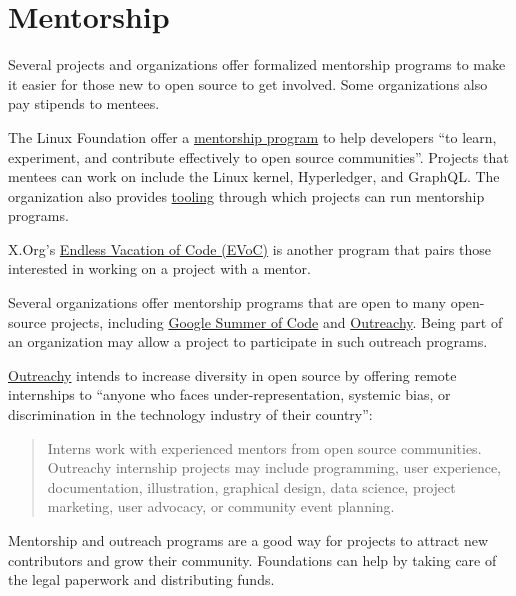 


\chapter{Mentorship}

Several projects and organizations offer formalized mentorship programs to make it easier for those new to open source to get involved.  Some organizations also pay stipends to mentees.

The Linux Foundation offer a \href{https://www.linuxfoundation.org/en/about/diversity-inclusivity/mentorship/}{mentorship program} to help developers ``to learn, experiment, and contribute effectively to open source communities''.  Projects that mentees can work on include the Linux kernel, Hyperledger, and GraphQL.  The organization also provides \href{https://lfx.linuxfoundation.org/tools/mentorship}{tooling} through which projects can run mentorship programs.

X.Org's \href{https://www.x.org/wiki/XorgEVoC/}{Endless Vacation of Code (EVoC)} is another program that pairs those interested in working on a project with a mentor.

Several organizations offer mentorship programs that are open to many open-source projects, including \href{https://summerofcode.withgoogle.com/}{Google Summer of Code} and \href{https://www.outreachy.org/}{Outreachy}.  Being part of an organization may allow a project to participate in such outreach programs.

\begin{kaobox}[frametitle=Outreachy: increasing diversity in open source]

\href{https://www.outreachy.org/}{Outreachy} intends to increase diversity in open source by offering remote internships to ``anyone who faces under-representation, systemic bias, or discrimination in the technology industry of their country'':

\begin{quote}

Interns work with experienced mentors from open source communities. Outreachy internship projects may include programming, user experience, documentation, illustration, graphical design,  data science, project marketing, user advocacy, or community event planning.

\end{quote}

\end{kaobox}

Mentorship and outreach programs are a good way for projects to attract new contributors and grow their community.  Foundations can help by taking care of the legal paperwork and distributing funds.

